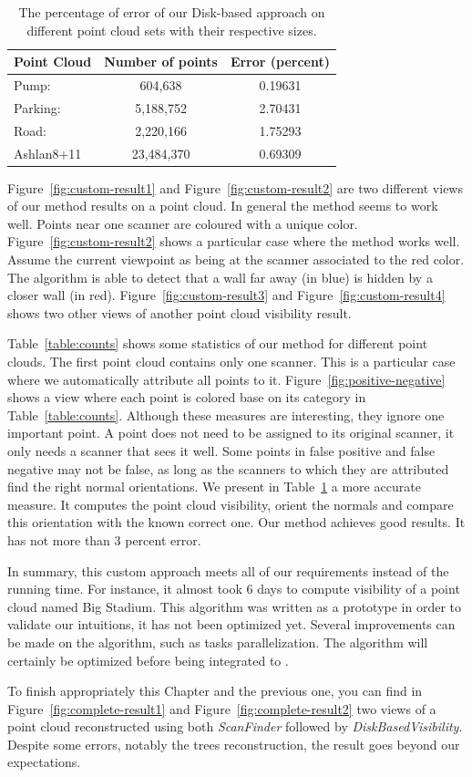 \begin{table}[]
  \centering
  \begin{tabular}{l|c|c}
    Point Cloud & Number of points & Error (percent) \\\hline
    Pump: & 604,638 &  0.19631 \\\hline
    Parking: & 5,188,752 & 2.70431 \\\hline
    Road: & 2,220,166 & 1.75293 \\\hline
    Ashlan8+11 & 23,484,370 & 0.69309
  \end{tabular}
  \caption{The percentage of error of our Disk-based approach on different point cloud sets with their respective sizes.}
  \label{table:vis-error}
\end{table}
Figure~\ref{fig:custom-result1} and Figure~\ref{fig:custom-result2} are two different views of our method results on a point cloud. In general the method seems to work well. Points near one scanner are coloured with a unique color. Figure~\ref{fig:custom-result2} shows a particular case where the method works well. Assume the current viewpoint as being at the scanner associated to the red color. The algorithm is able to detect that a wall far away (in blue) is hidden by a closer wall (in red). Figure~\ref{fig:custom-result3} and Figure~\ref{fig:custom-result4} shows two other views of another point cloud visibility result.

Table~\ref{table:counts} shows some statistics of our method for different point clouds. The first point cloud contains only one scanner. This is a particular case where we automatically attribute all points to it. Figure~\ref{fig:positive-negative} shows a view where each point is colored base on its category in Table~\ref{table:counts}. Although these measures are interesting, they ignore one important point. A point does not need to be assigned to its original scanner,
it only needs a scanner that sees it well. Some points in false positive and false negative may not be false, as long as the scanners to which they are attributed find the right normal orientations. We present in Table~\ref{table:vis-error} a more accurate measure. It computes the point cloud visibility, orient the normals and compare this orientation with the known correct one. Our method achieves good results. It has not more than $3$ percent error.

In summary, this custom approach meets all of our requirements instead of the running time. For instance, it almost took 6 days to compute visibility of a point cloud named Big Stadium. This algorithm was written as a prototype in order to validate our intuitions, it has not been optimized yet. Several improvements can be made on the algorithm, such as tasks parallelization. The algorithm will certainly be optimized before being integrated to \CC.

To finish appropriately this Chapter and the previous one, you can find in Figure~\ref{fig:complete-result1} and Figure~\ref{fig:complete-result2} two views of a point cloud reconstructed using both \emph{ScanFinder} followed by \emph{DiskBasedVisibility}. Despite some errors, notably the trees reconstruction, the result goes beyond our expectations.
